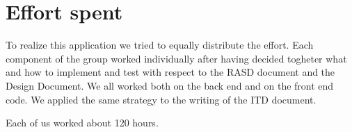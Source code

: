 \section{Effort spent}
To realize this application we tried to equally distribute the effort. Each component of the group worked individually after having decided togheter what and how to implement and test with respect to the RASD document and the Design Document.
We all worked both on the back end and on the front end code.
We applied the same strategy to the writing of the ITD document.

Each of us worked about 120 hours.